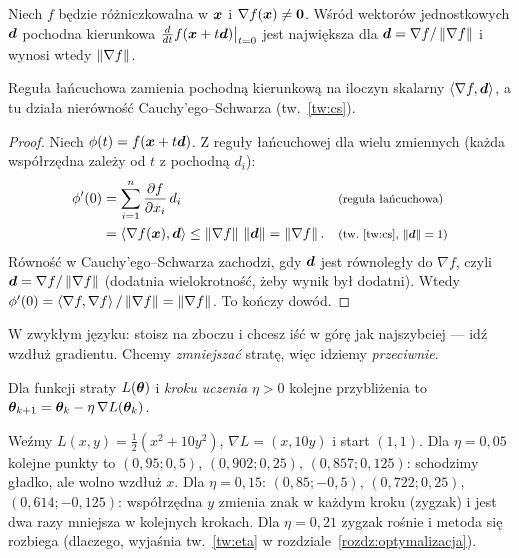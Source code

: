 \begin{twierdzenie}\label{tw:gradient-najszybszy}
Niech $f$ będzie różniczkowalna w $\bm{x}$ i $\nabla f(\bm{x})\neq\bm{0}$. Wśród wektorów jednostkowych $\bm{d}$ pochodna kierunkowa
$\frac{d}{dt}f(\bm{x}+t\bm{d})\big|_{t=0}$ jest największa dla $\bm{d}=\nabla f/\left\lVert \nabla f\right\rVert$ i wynosi wtedy $\left\lVert \nabla f\right\rVert$.
\end{twierdzenie}
\begin{pomyslDowodu}
Reguła łańcuchowa zamienia pochodną kierunkową na iloczyn skalarny $\left\langle \nabla f,\bm{d}\right\rangle$, a tu działa nierówność Cauchy'ego--Schwarza (tw.~\ref{tw:cs}).
\end{pomyslDowodu}
\begin{proof}
Niech $\phi(t)=f(\bm{x}+t\bm{d})$. Z reguły łańcuchowej dla wielu zmiennych (każda współrzędna zależy od $t$ z pochodną $d_i$):
\begin{align*}
\phi'(0) &= \sum_{i=1}^{n}\frac{\partial f}{\partial x_i}\,d_i && \text{\footnotesize (reguła łańcuchowa)}\\
 &= \left\langle \nabla f(\bm{x}),\bm{d}\right\rangle\le\left\lVert \nabla f\right\rVert\,\left\lVert \bm{d}\right\rVert=\left\lVert \nabla f\right\rVert. && \text{\footnotesize (tw.~\ref{tw:cs}, $\left\lVert \bm{d}\right\rVert=1$)}
\end{align*}
Równość w Cauchy'ego--Schwarza zachodzi, gdy $\bm{d}$ jest równoległy do $\nabla f$, czyli $\bm{d}=\nabla f/\left\lVert \nabla f\right\rVert$ (dodatnia wielokrotność, żeby wynik był dodatni).
Wtedy $\phi'(0)=\left\langle \nabla f,\nabla f\right\rangle/\left\lVert \nabla f\right\rVert=\left\lVert \nabla f\right\rVert$. To kończy dowód.
\end{proof}

W zwykłym języku: stoisz na zboczu i chcesz iść w górę jak najszybciej --- idź wzdłuż gradientu. Chcemy \emph{zmniejszać}
stratę, więc idziemy \emph{przeciwnie}.

\begin{definicja}\label{def:spadek}
Dla funkcji straty $L(\bm{\theta})$ i \emph{kroku uczenia} $\eta>0$ kolejne przybliżenia to
$\bm{\theta}_{k+1}=\bm{\theta}_k-\eta\,\nabla L(\bm{\theta}_k)$.
\end{definicja}

\begin{naliczbach}
Weźmy $L(x,y)=\tfrac12(x^2+10y^2)$, $\nabla L=(x,10y)$ i start $(1,1)$. Dla $\eta=0{,}05$ kolejne punkty to
$(0{,}95;0{,}5)$, $(0{,}902;0{,}25)$, $(0{,}857;0{,}125)$: schodzimy gładko, ale wolno wzdłuż $x$. Dla $\eta=0{,}15$:
$(0{,}85;-0{,}5)$, $(0{,}722;0{,}25)$, $(0{,}614;-0{,}125)$: współrzędna $y$ zmienia znak w każdym kroku
(zygzak) i jest dwa razy mniejsza w kolejnych krokach. Dla $\eta=0{,}21$ zygzak rośnie i metoda się rozbiega
(dlaczego, wyjaśnia tw.~\ref{tw:eta} w rozdziale~\ref{rozdz:optymalizacja}).
\end{naliczbach}

